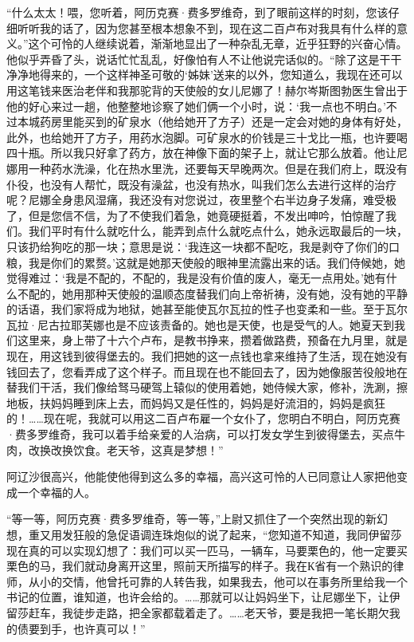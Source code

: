 \par “什么太太！喂，您听着，阿历克赛·费多罗维奇，到了眼前这样的时刻，您该仔细听听我的话了，因为您甚至根本想象不到，现在这二百卢布对我具有什么样的意义。”这个可怜的人继续说着，渐渐地显出了一种杂乱无章，近乎狂野的兴奋心情。他似乎弄昏了头，说话忙忙乱乱，好像怕有人不让他说完话似的。“除了这是干干净净地得来的，一个这样神圣可敬的‘姊妹’送来的以外，您知道么，我现在还可以用这笔钱来医治老伴和我那驼背的天使般的女儿尼娜了！赫尔岑斯图勃医生曾出于他的好心来过一趟，他整整地诊察了她们俩一个小时，说：‘我一点也不明白。’不过本城药房里能买到的矿泉水（他给她开了方子）还是一定会对她的身体有好处，此外，也给她开了方子，用药水泡脚。可矿泉水的价钱是三十戈比一瓶，也许要喝四十瓶。所以我只好拿了药方，放在神像下面的架子上，就让它那么放着。他让尼娜用一种药水洗澡，化在热水里洗，还要每天早晚两次。但是在我们府上，既没有仆役，也没有人帮忙，既没有澡盆，也没有热水，叫我们怎么去进行这样的治疗呢？尼娜全身患风湿痛，我还没有对您说过，夜里整个右半边身子发痛，难受极了，但是您信不信，为了不使我们着急，她竟硬挺着，不发出呻吟，怕惊醒了我们。我们平时有什么就吃什么，能弄到点什么就吃点什么，她永远取最后的一块，只该扔给狗吃的那一块；意思是说：‘我连这一块都不配吃，我是剥夺了你们的口粮，我是你们的累赘。’这就是她那天使般的眼神里流露出来的话。我们侍候她，她觉得难过：‘我是不配的，不配的，我是没有价值的废人，毫无一点用处。’她有什么不配的，她用那种天使般的温顺态度替我们向上帝祈祷，没有她，没有她的平静的话语，我们家将成为地狱，她甚至能使瓦尔瓦拉的性子也变柔和一些。至于瓦尔瓦拉·尼古拉耶芙娜也是不应该责备的。她也是天使，也是受气的人。她夏天到我们这里来，身上带了十六个卢布，是教书挣来，攒着做路费，预备在九月里，就是现在，用这钱到彼得堡去的。我们把她的这一点钱也拿来维持了生活，现在她没有钱回去了，您看弄成了这个样子。而且现在也不能回去了，因为她像服苦役般地在替我们干活，我们像给驽马硬驾上辕似的使用着她，她侍候大家，修补，洗涮，擦地板，扶妈妈睡到床上去，而妈妈又是任性的，妈妈是好流泪的，妈妈是疯狂的！……现在呢，我就可以用这二百卢布雇一个女仆了，您明白不明白，阿历克赛·费多罗维奇，我可以着手给亲爱的人治病，可以打发女学生到彼得堡去，买点牛肉，改换改换饮食。老天爷，这真是梦想！”
\par 阿辽沙很高兴，他能使他得到这么多的幸福，高兴这可怜的人已同意让人家把他变成一个幸福的人。
\par “等一等，阿历克赛·费多罗维奇，等一等，”上尉又抓住了一个突然出现的新幻想，重又用发狂般的急促语调连珠炮似的说了起来，“您知道不知道，我同伊留莎现在真的可以实现幻想了：我们可以买一匹马，一辆车，马要栗色的，他一定要买栗色的马，我们就动身离开这里，照前天所描写的样子。我在К省有一个熟识的律师，从小的交情，他曾托可靠的人转告我，如果我去，他可以在事务所里给我一个书记的位置，谁知道，也许会给的。……那就可以让妈妈坐下，让尼娜坐下，让伊留莎赶车，我徒步走路，把全家都载着走了。……老天爷，要是我把一笔长期欠我的债要到手，也许真可以！”
